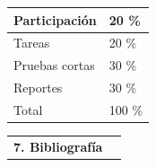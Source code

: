 \documentclass[letterpaper]{article}%
\begin{document}
\vspace*{2mm}%
\newline%
 \begin{minipage}{\linewidth}  \centering  \begin{tabular}{ p{4cm}  p{1.5cm} }  \toprule  Participación & 20 \% \\  \midrule  Tareas & 20 \% \\  \midrule  Pruebas cortas & 30 \% \\  \midrule  Reportes & 30 \% \\  \midrule Total & 100 \% \\  \bottomrule  \end{tabular} \end{minipage}%
\vspace*{4mm}%
\newline%
\begin{tabularx}{\textwidth}{p{3cm}p{13cm}}%
\par\fontsize{12}{14}\selectfont \textbf{\textcolor{parte}{7. Bibliografía}}&\nocite{ida2020sensors} \nocite{fraden2016sensors} \nocite{pallas2012sensors} \\%
\end{tabularx}%
\vspace*{-8mm}\printbibliography[heading=none]%
\end{document}
